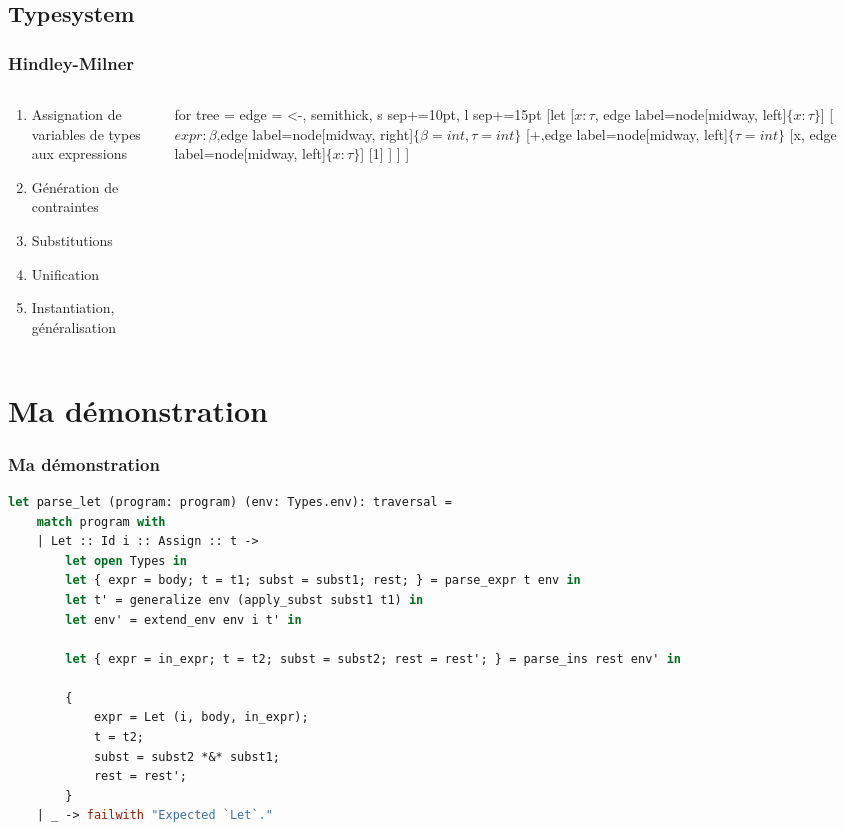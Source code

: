 \documentclass{beamer}
\begin{document}
\subsection{Typesystem}
\begin{frame}
		\begin{small}
		\frametitle{Hindley-Milner}
		\begin{columns}
				\begin{column}{0.5\textwidth}
						\begin{enumerate}
								\item Assignation de variables de types aux expressions
								\item Génération de contraintes
								\item Substitutions
								\item Unification
								\item Instantiation, généralisation
						\end{enumerate}
				\end{column}
				\begin{column}{0.5\textwidth}
						\begin{forest}
								for tree = {
										edge = {<-, semithick},
										s sep+=10pt,
										l sep+=15pt
								}
								[let
								[$x: \tau$, edge label={node[midway, left]{$\{x:\tau\}$}}]
										[$expr:\beta$,edge label={node[midway, right]{$\{\beta = int, \tau = int\}$}}
												[+,edge label={node[midway, left]{$\{\tau = int\}$}}
														[x, edge label={node[midway, left]{$\{x:\tau\}$}}]
														[1]	
												]
										]
								]
						\end{forest}
				\end{column}
		\end{columns}
\end{small}
\end{frame}

\section{Ma démonstration}
\begin{frame}[fragile]
		\frametitle{Ma démonstration}
		\begin{lstlisting}[language=ML]
let parse_let (program: program) (env: Types.env): traversal =
    match program with
    | Let :: Id i :: Assign :: t -> 
        let open Types in
        let { expr = body; t = t1; subst = subst1; rest; } = parse_expr t env in
        let t' = generalize env (apply_subst subst1 t1) in 
        let env' = extend_env env i t' in 

        let { expr = in_expr; t = t2; subst = subst2; rest = rest'; } = parse_ins rest env' in

        {
            expr = Let (i, body, in_expr);
            t = t2;
            subst = subst2 *&* subst1;
            rest = rest';
        }
    | _ -> failwith "Expected `Let`."
		\end{lstlisting}
\end{frame}
\end{document}
